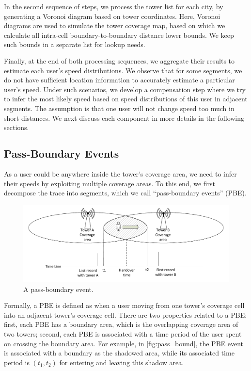 In the second sequence of steps, we process the tower list for each city, by generating a Voronoi diagram based on tower coordinates. Here, Voronoi diagrams are used to simulate the tower coverage map, based on which we calculate all intra-cell boundary-to-boundary distance lower bounds. We keep such bounds in a separate list for lookup needs.

Finally, at the end of both processing sequences, we aggregate their results to estimate each user's speed distributions. We observe that for some segments, we do not have sufficient location information to accurately estimate a particular user's speed. Under such scenarios, we develop a compensation step where we try to infer the most likely speed based on speed distributions of this user in adjacent segments. The assumption is that one user will not change speed too much in short distances. We next discuss each component in more details in the following sections.

\subsection{Pass-Boundary Events}

As a user could be anywhere inside the tower's coverage area, we need to infer their speeds by exploiting multiple coverage areas. To this end, we first decompose the trace into segments, which we call ``pass-boundary events'' (PBE).

\begin{figure}[h]
    \centering
    \includegraphics[width=\linewidth]{./figures/passing_boundary.pdf}
    \vspace{-0.3in}
    \caption{A pass-boundary event.}
    \label{fig:pass_bound}
\end{figure}


Formally, a PBE is defined as when a user moving from one tower's coverage cell into an adjacent tower's coverage cell. There are two properties related to a PBE: first, each PBE has a boundary area, which is the overlapping coverage area of two towers; second, each PBE is associated with a time period of the user spent on crossing the boundary area. For example, in \autoref{fig:pass_bound}, the PBE event is associated with a boundary as the shadowed area, while its associated time period is $(t_1, t_2)$ for entering and leaving this shadow area.

